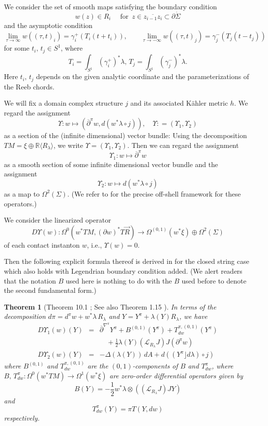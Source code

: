 \documentclass[reqno]{amsart}
\def\R{\ifmmode{\mathbb R}\else{$\mathbb R$}\fi} %
\newcommand{\del}{\partial}
\newcommand{\be}{\begin{equation}}
\newcommand{\ee}{\end{equation}}
\newcommand{\bea}{\begin{eqnarray}}
\newcommand{\eea}{\end{eqnarray}}
\theoremstyle{theorem}
\newtheorem{thm}{Theorem}[section]
\theoremstyle{definition}
\numberwithin{equation}{section}
\def\R{{\mathbb R}}
\def\R{{\mathbb R}}
\def\delbar{{\overline \partial}}
\def\R{\ifmmode{\mathbb R}\else{$\mathbb R$}\fi} %
\def\R{{\mathbb R}}
\def\R{{\mathbb R}}
\def\delbar{{\overline \partial}}
\def\CL{{\mathcal L}}
\begin{document}
We consider the set of smooth maps satisfying the boundary condition
\be\label{eq:bdy-condition}
w(z) \in R_i \quad \text{ for } \, z \in \overline{z_{i-1}z_i} \subset \del \dot \Sigma
\ee
and the asymptotic condition
\be\label{eq:asymp-condition}
\lim_{\tau \to \infty}w((\tau,t)_i) = \gamma^+_i(T_i(t+t_i)), \qquad
\lim_{\tau \to - \infty}w((\tau,t)_j) = \gamma^-_j(T_j(t-t_j))
\ee
for some $t_i, \, t_j \in S^1$, where
$$
T_i = \int_{S^1} (\gamma^+_i)^*\lambda, \, T_j = \int_{S^1} ( \gamma^-_j)^*\lambda.
$$
Here $t_i,\, t_j$ depends on the given analytic coordinate and the parameterizations of
the Reeb chords.

We will fix a domain complex structure $j$ and its associated K\"ahler metric $h$.
We regard the assignment
$$
\Upsilon: w \mapsto \left(\delbar^\pi w, d(w^*\lambda \circ j)\right), \quad
\Upsilon: = (\Upsilon_1,\Upsilon_2)
$$
as a section of the (infinite dimensional) vector bundle: Using the decomposition
$TM = \xi \oplus \R\langle R_\lambda \rangle$, we write $\Upsilon = (\Upsilon_1, \Upsilon_2)$.
Then we can regard the assignment
$$
\Upsilon_1: w \mapsto \delbar^\pi w
$$
as a smooth section of some infinite dimensional vector bundle and
the assignment
$$
\Upsilon_2: w \mapsto d(w^*\lambda \circ j)
$$
as a map to $\Omega^2(\Sigma)$.
(We refer to \cite{oh:contacton-transversality} for the precise off-shell framework
for these operators.)

We consider the linearized operator
$$
D\Upsilon(w): \Omega^0(w^*TM,(\del w)^*T\vec R) \to \Omega^{(0,1)}(w^*\xi) \oplus \Omega^2(\Sigma)
$$
of each contact instanton $w$, i.e., $\Upsilon(w) = 0$.

Then the following explicit formula thereof is derived in \cite{oh:contacton} for the closed
string case which also holds with Legendrian boundary condition added.
(We alert readers that the notation $B$ used here is nothing to do with the $B$ used before
to denote the second fundamental form.)


\begin{thm}[Theorem 10.1 \cite{oh:contacton}; See also Theorem 1.15
\cite{oh-savelyev}] \label{thm:linearization} In terms of the decomposition
$d\pi = d^\pi w + w^*\lambda\, R_\lambda$
and $Y = Y^\pi + \lambda(Y) R_\lambda$, we have
\bea
D\Upsilon_1(w)(Y) & = & \delbar^{\nabla^\pi}Y^\pi + B^{(0,1)}(Y^\pi) +  T^{\pi,(0,1)}_{dw}(Y^\pi)\nonumber\\
&{}& \quad + \frac{1}{2}\lambda(Y) (\CL_{R_\lambda}J)J(\del^\pi w)
\label{eq:DUpsilon1}\\
D\Upsilon_2(w)(Y) & = &  - \Delta (\lambda(Y))\, dA + d((Y^\pi \rfloor d\lambda) \circ j)
\label{eq:DUpsilon2}
\eea
where $B^{(0,1)}$ and $T_{dw}^{\pi,(0,1)}$ are the $(0,1)$-components of $B$ and
$T_{dw}^\pi$, where $B, \, T_{dw}^\pi: \Omega^0(w^*TM) \to \Omega^1(w^*\xi)$ are
 zero-order differential operators given by
\be\label{eq:B}
B(Y) =
- \frac{1}{2}  w^*\lambda \otimes \left((\CL_{R_\lambda}J)J Y\right)
\ee
and
\be\label{eq:torsion-dw}
T_{dw}^\pi(Y) = \pi T(Y,dw)
\ee
respectively.
\end{thm}
\end{document}
